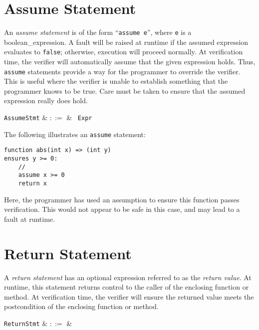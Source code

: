 \section{Assume Statement}

An {\em assume statement} is of the form ``\lstinline{assume e}'', where \lstinline{e} is a \gls{boolean_expression}.  A \gls{fault} will be raised at runtime if the assumed expression evaluates to \lstinline{false}; otherwise, execution will proceed normally.  At verification time, the verifier will automatically assume that the given expression holds.  Thus, \lstinline{assume} statements provide a way for the programmer to override the verifier.  This is useful where the verifier is unable to establish something that the programmer knows to be true.  Care must be taken to ensure that the assumed expression really does hold.

\begin{syntax}
  \verb+AssumeStmt+ & $::=$ & \ \verb+Expr+\\
\end{syntax}

\noindent The following illustrates an \lstinline{assume} statement:

\begin{lstlisting}
function abs(int x) => (int y)
ensures y >= 0:
    //
    assume x >= 0
    return x
\end{lstlisting}

Here, the programmer has used an assumption to ensure this function passes verification.  This would not appear to be safe in this case, and may lead to a fault at runtime.


\section{Return Statement}

A {\em return statement} has an optional expression referred to as the {\em return value}.  At runtime, this statement returns control to the caller of the enclosing function or method.  At verification time, the verifier will ensure the returned value meets the \gls{postcondition} of the enclosing function or method.

\begin{syntax}
  \verb+ReturnStmt+ & $::=$ & \ \\
\end{syntax}

